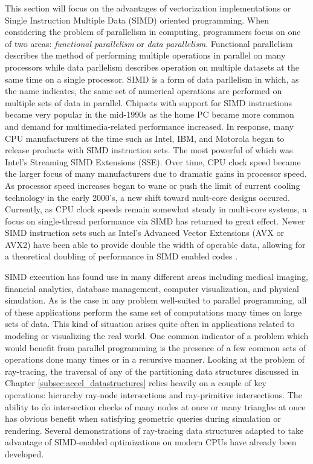\documentclass[12pt, a4paper]{article}
\begin{document}
This section will focus on the advantages of vectorization implementations or Single Instruction Multiple Data (SIMD) oriented programming. When considering the problem of parallelism in computing, programmers focus on one of two areas: \textit{functional parallelism} or \textit{data parallelism}. Functional parallelism describes the method of performing multiple operations in parallel on many processors while data parllelism describes operation on multiple datasets at the same time on a single processor. SIMD is a form of data parllelism in which, as the name indicates, the same set of numerical operations are performed on multiple sets of data in parallel. Chipsets with support for SIMD instructions became very popular in the mid-1990s as the home PC became more common and demand for multimedia-related performance increased. In response, many CPU manufacturers at the time such as Intel, IBM, and Motorola began to release products with SIMD instruction sets. The most powerful of which was Intel's Streaming SIMD Extensions (SSE). Over time, CPU clock speed became the larger focus of many manufacturers due to dramatic gains in processor speed. As processor speed increases began to wane or push the limit of current cooling technology in the early 2000's, a new shift toward mult-core designs occured. Currently, as CPU clock speeds remain somewhat steady in multi-core systems, a focus on single-thread performance via SIMD has returned to great effect. Newer SIMD instruction sets such as Intel's Advanced Vector Extensions (AVX or AVX2) have been able to provide double the width of operable data, allowing for a theoretical doubling of performance in SIMD enabled codes \cite{Hughes_2015}.

SIMD execution has found use in many different areas including medical imaging, financial analytics, database management, computer visualization, and physical simulation. As is the case in any problem well-suited to parallel programming, all of these applications perform the same set of computations many times on large sets of data. This kind of situation arises quite often in applications related to modeling or visualizing the real world. One common indicator of a problem which would benefit from parallel programming is the presence of a few common sets of operations done many times or in a recursive manner. Looking at the problem of ray-tracing, the traversal of any of the partitioning data structures discussed in Chapter \ref{subsec:accel_datastructures} relies heavily on a couple of key operations: hierarchy ray-node intersections and ray-primitive intersections. The ability to do intersection checks of many nodes at once or many triangles at once has obvious benefit when satisfying geometric queries during simulation or rendering. Several demonstrations of ray-tracing data structures adapted to take advantage of SIMD-enabled optimizations on modern CPUs have already been developed.
\end{document}
